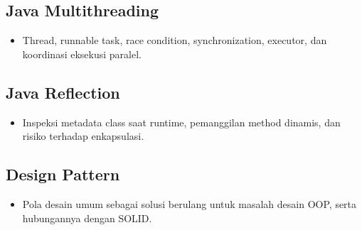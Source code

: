 \documentclass[11pt,a4paper]{article}
\begin{document}
\subsection{Java Multithreading}
\begin{itemize}
    \item Thread, runnable task, race condition, synchronization, executor, dan koordinasi eksekusi paralel.
\end{itemize}

\subsection{Java Reflection}
\begin{itemize}
    \item Inspeksi metadata class saat runtime, pemanggilan method dinamis, dan risiko terhadap enkapsulasi.
\end{itemize}

\subsection{Design Pattern}
\begin{itemize}
    \item Pola desain umum sebagai solusi berulang untuk masalah desain OOP, serta hubungannya dengan SOLID.
\end{itemize}

\newpage

\newpage

\newpage

\newpage

\newpage

\newpage

\newpage

\newpage

\newpage

\newpage

\newpage

\newpage

\newpage

\newpage

\newpage

\end{document}
